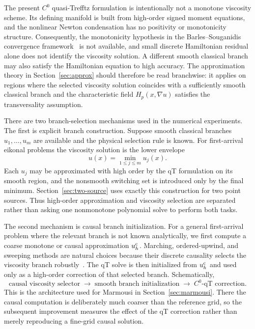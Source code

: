 \documentclass[preprint,12pt]{elsarticle}
\newcommand{\grad}{\nabla}
\begin{document}
The present $C^0$ quasi-Trefftz formulation is intentionally not a monotone viscosity scheme.  Its defining manifold is built from high-order signed moment equations, and the nonlinear Newton condensation has no positivity or monotonicity structure.  Consequently, the monotonicity hypothesis in the Barles--Souganidis convergence framework~\cite{BarlesSouganidis1991} is not available, and small discrete Hamiltonian residual alone does not identify the viscosity solution.  A different smooth classical branch may also satisfy the Hamiltonian equation to high accuracy.  The approximation theory in Section~\ref{sec:approx} should therefore be read branchwise: it applies on regions where the selected viscosity solution coincides with a sufficiently smooth classical branch and the characteristic field $H_p(x,\grad u)$ satisfies the transversality assumption.

There are two branch-selection mechanisms used in the numerical experiments.  The first is explicit branch construction.  Suppose smooth classical branches $u_1,\ldots,u_m$ are available and the physical selection rule is known.  For first-arrival eikonal problems the viscosity solution is the lower envelope
\begin{equation}\label{eq:visc-min}
   u(x)=\min_{1\le j\le m}u_j(x).
\end{equation}
Each $u_j$ may be approximated with high order by the qT formulation on its smooth region, and the nonsmooth switching set is introduced only by the final minimum.  Section~\ref{sec:two-source} uses exactly this construction for two point sources.  Thus high-order approximation and viscosity selection are separated rather than asking one nonmonotone polynomial solve to perform both tasks.

The second mechanism is causal branch initialization.  For a general first-arrival problem where the relevant branch is not known analytically, we first compute a coarse monotone or causal approximation $u_h^{\rm c}$.  Marching, ordered-upwind, and sweeping methods are natural choices because their discrete causality selects the viscosity branch robustly~\cite{Sethian1996,SethianVladimirsky2003,Zhao2005}.  The qT solve is then initialized from $u_h^{\rm c}$ and used only as a high-order correction of that selected branch.  Schematically,
\begin{equation}\label{eq:causal-qt}
   \text{causal viscosity selector}
   \;\longrightarrow\;
   \text{smooth branch initialization}
   \;\longrightarrow\;
   C^0\text{-qT correction}.
\end{equation}
This is the architecture used for Marmousi in Section~\ref{sec:marmousi}.  There the causal computation is deliberately much coarser than the reference grid, so the subsequent improvement measures the effect of the qT correction rather than merely reproducing a fine-grid causal solution.
\end{document}
